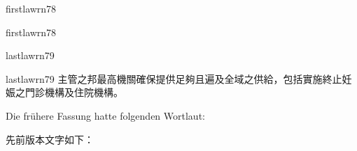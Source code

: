 \documentclass[12pt]{article}
\begin{document}
\begin{sourceboxpara}[title={原文理由 A.II.3.c 新法第4條}]
\begin{lawboxpart}{first}{lawrn78}
\end{lawboxpart}
\end{sourceboxpara}
\begin{transboxpara}
\begin{lawboxpart}{first}{lawrn78}
\end{lawboxpart}
\end{transboxpara}
\begin{sourceboxpara}
\begin{lawboxpart}{last}{lawrn79}
\end{lawboxpart}
\end{sourceboxpara}
\begin{transboxpara}
\begin{lawboxpart}{last}{lawrn79}
主管之邦最高機關確保提供足夠且遍及全域之供給，包括實施終止妊娠之門診機構及住院機構。
\end{lawboxpart}
\end{transboxpara}

\begin{sourcepara}[title={原文理由 A.II.3.c 舊法第4條前文}]
Die frühere Fassung hatte folgenden Wortlaut:
\end{sourcepara}
\begin{transpara}
先前版本文字如下：
\end{transpara}
\end{document}
